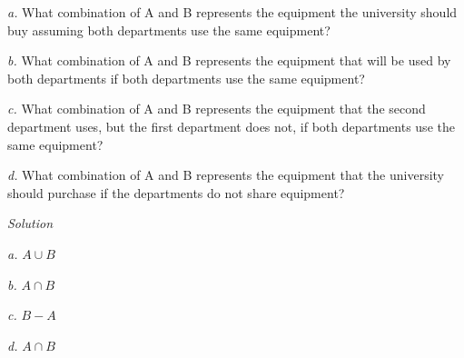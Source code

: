 \documentclass[10pt]{article}
\begin{document}
\par \textit{a.} What combination of A and B represents the equipment the university
should buy assuming both departments use the same equipment?
\par \textit{b.} What combination of A and B represents the equipment that will be
used by both departments if both departments use the same equipment?
\par \textit{c.} What combination of A and B represents the equipment that the second
department uses, but the first department does not, if both departments use the same
equipment?
\par \textit{d.} What combination of A and B represents the equipment that the
university should purchase if the departments do not share equipment?

\bigbreak
\textit{Solution} 
\bigbreak

\par \textit{a.} $A \cup B$
\par \textit{b.} $A \cap B$
\par \textit{c.} $B - A$
\par \textit{d.} $A \cap B$
\end{document}
